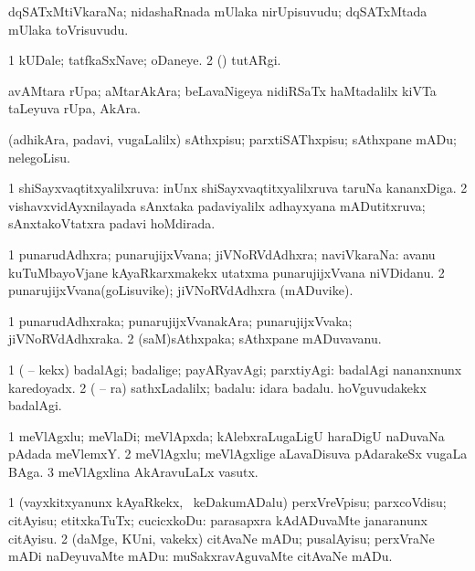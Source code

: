 \bentry
{}
\gl{\nA}
\bmng
dqSATxMtiVkaraNa; nidashaRnada mUlaka nirUpisuvudu; dqSATxMtada mUlaka toVrisuvudu. 
\emng
\eentry

\bentry
{}
\gl{\kirxvi}
\bmng
\bnum
\num{1} kUDale; tatfkaSxNave; oDaneye. 
\num{2} (\pArxparx) tutARgi. 
\enum
\emng
\eentry

\bentry
{}
\gl{\nA}
\bmng
avAMtara rUpa; aMtarAkAra; beLavaNigeya nidiRSaTx haMtadalilx kiVTa taLeyuva rUpa, AkAra. 
\emng
\eentry

\bentry
{}
\gl{\sakirx}
\bmng
(adhikAra, padavi, \mo vugaLalilx) sAthxpisu; parxtiSAThxpisu; sAthxpane mADu; nelegoLisu. 
\emng
\eentry

\bentry
{}
\gl{\gu}
\expl{\Latin }
\bmng
\bnum
\num{1} shiSayxvaqtitxyalilxruva:  inUnx shiSayxvaqtitxyalilxruva taruNa kananxDiga. 
\num{2} vishavxvidAyxnilayada sAnxtaka padaviyalilx adhayxyana mADutitxruva; sAnxtakoVtatxra padavi hoMdirada. 
\enum
\emng
\eentry

\bentry
{}
\gl{\nA}
\bmng
\bnum
\num{1} punarudAdhxra; punarujijxVvana; jiVNoRVdAdhxra; naviVkaraNa:  avanu kuTuMbayoVjane kAyaRkarxmakekx utatxma punarujijxVvana niVDidanu. 
\num{2} punarujijxVvana(goLisuvike); jiVNoRVdAdhxra (mADuvike). 
\enum
\emng
\eentry

\bentry
{}
\gl{\nA}
\bmng
\bnum
\num{1} punarudAdhxraka; punarujijxVvanakAra; punarujijxVvaka; jiVNoRVdAdhxraka. 
\num{2} (saM)sAthxpaka; sAthxpane mADuvavanu. 
\enum
\emng
\eentry

\bentry
{}
\gl{\kirxvi}
\bmng
\bnum
\num{1} ( -- kekx) badalAgi; badalige; payARyavAgi; parxtiyAgi:  badalAgi nananxnunx karedoyadx. 
\num{2} ( -- ra) sathxLadalilx; badalu:  idara badalu.  hoVguvudakekx badalAgi. 
\enum
\emng
\eentry

\bentry
{}
\gl{\nA}
\bmng
\bnum
\num{1} meVlAgxlu; meVlaDi; meVlApxda; kAlebxraLugaLigU haraDigU naDuvaNa pAdada meVlemxY. 
\num{2} meVlAgxlu; meVlAgxlige aLavaDisuva pAdarakeSx \mo vugaLa BAga. 
\num{3} meVlAgxlina AkAravuLaLx vasutx. 
\enum
\emng
\eentry

\bentry
{}
\gl{\sakirx}
\bmng
\bnum
\num{1} (vayxkitxyanunx kAyaRkekx, \sA\ keDakumADalu) perxVreVpisu; parxcoVdisu; citAyisu; etitxkaTuTx; cucicxkoDu:  parasapxra kAdADuvaMte janaranunx citAyisu. 
\num{2} (daMge, KUni, \mo vakekx) citAvaNe mADu; pusalAyisu; perxVraNe mADi naDeyuvaMte mADu:  muSakxravAguvaMte citAvaNe mADu. 
\enum
\emng
\eentry

